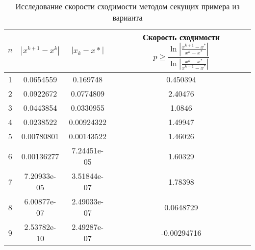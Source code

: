 \documentclass{article}
\begin{document}
    \begin{table}[H]
        \centering
        \caption{Исследование скорости сходимости методом секущих примера из варианта}
        \begin{tabular}{|c|c|c|c|}
            \hline
            $n$ & $|x^{k+1} - x^k|$ & $ |x_k - x*|$ & Скорость сходимости $p \geqslant \dfrac{\ln | \frac{x^{k+1}-x^*}{x^k - x^*} |}{\ln |\frac{x^k -x^*}{x^{k-1} - x^*}|}$ \\
            \hline 
            1 & 0.0654559 & 0.169748 & 0.450394 \\ \hline
            2 & 0.0922672 & 0.0774809 & 2.40476 \\ \hline
            3 & 0.0443854 & 0.0330955 & 1.0846 \\ \hline
            4 & 0.0238522 & 0.00924322 & 1.49947 \\ \hline
            5 & 0.00780801 & 0.00143522 & 1.46026 \\ \hline
            6 & 0.00136277 & 7.24451e-05 & 1.60329 \\ \hline
            7 & 7.20933e-05 & 3.51844e-07 & 1.78398 \\ \hline
            8 & 6.00877e-07 & 2.49033e-07 & 0.0648729 \\ \hline
            9 & 2.53782e-10 & 2.49287e-07 & -0.00294716 \\ \hline
        \end{tabular}
    \end{table}
\end{document}
